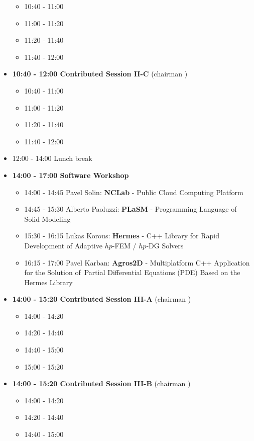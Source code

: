 \documentclass[10pt, A4]{article}%
\begin{document}
\begin{itemize}
  \begin{itemize}
    \item 10:40 - 11:00
    \item 11:00 - 11:20 
    \item 11:20 - 11:40 
    \item 11:40 - 12:00  
  \end{itemize}
  \item {\bf 10:40 - 12:00 Contributed Session II-C} (chairman ) 
  \begin{itemize}
    \item 10:40 - 11:00
    \item 11:00 - 11:20 
    \item 11:20 - 11:40 
    \item 11:40 - 12:00 
  \end{itemize}
  \item 12:00 - 14:00 Lunch break
  \item {\bf 14:00 - 17:00 Software Workshop}
  \begin{itemize}
    \item 14:00 - 14:45 Pavel Solin: {\bf NCLab} - Public Cloud Computing Platform
    \item 14:45 - 15:30 Alberto Paoluzzi: {\bf PLaSM} - Programming Language of Solid Modeling
    \item 15:30 - 16:15 Lukas Korous: {\bf Hermes} - C++ Library for Rapid Development of Adaptive $hp$-FEM / $hp$-DG Solvers
    \item 16:15 - 17:00 Pavel Karban: {\bf Agros2D} - Multiplatform C++ Application for the Solution of~Partial Differential Equations (PDE) Based on the Hermes Library  
  \end{itemize}
  \item {\bf 14:00 - 15:20 Contributed Session III-A} (chairman ) 
  \begin{itemize}
    \item 14:00 - 14:20 
    \item 14:20 - 14:40 
    \item 14:40 - 15:00
    \item 15:00 - 15:20  
  \end{itemize}
  \item {\bf 14:00 - 15:20 Contributed Session III-B} (chairman ) 
  \begin{itemize}
    \item 14:00 - 14:20 
    \item 14:20 - 14:40 
    \item 14:40 - 15:00

\end{itemize}
\end{itemize}
\end{document}

